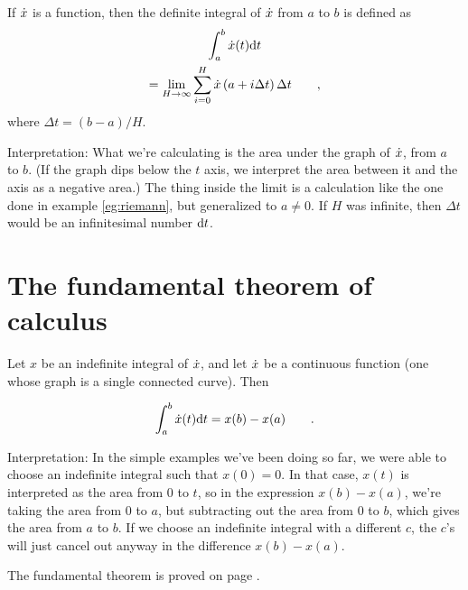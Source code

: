 \begin{important}
If $\dot{x}$ is a function, then the definite integral of $\dot{x}$ from $a$ to $b$ is
defined as
\begin{multline*}
  \int_{a}^{b} \dot{x}(t) \textup{d} t \\
= \lim_{H\rightarrow\infty} \sum_{i=0}^{H} \dot{x}\left(a+i\Delta t\right)\Delta t \qquad ,
\end{multline*}
where $\Delta t=(b-a)/H$.

Interpretation: What we're calculating is
the area under the graph of $\dot{x}$, from $a$ to $b$. (If the graph dips below the $t$ axis, we interpret the
area between it and the axis as a negative area.)
The thing inside the limit is a calculation like the one done in example \ref{eg:riemann},
but generalized to $a\ne 0$.
If $H$ was infinite, then $\Delta t$ would be an infinitesimal number $\textup{d} t$. 
\end{important}

\section{The fundamental theorem of calculus}

\begin{important}
Let $x$ be an indefinite integral of $\dot{x}$, and let $\dot{x}$ be a continuous
function (one whose graph is a single connected curve). Then

\begin{equation*}
  \int_{a}^{b} \dot{x}(t) \textup{d} t = x(b)-x(a) \qquad .
\end{equation*}

Interpretation: In the simple examples we've been doing so far,
we were able to choose an indefinite integral such that $x(0)=0$.
In that case, $x(t)$ is interpreted as the area from 0 to $t$,
so in the expression $x(b)-x(a)$, we're taking the area from
0 to $a$, but subtracting out the area from 0 to $b$, which gives
the area from $a$ to $b$. If we choose an indefinite integral with
a different $c$, the $c$'s will just cancel out anyway in the
difference  $x(b)-x(a)$.
\end{important}

The fundamental theorem is proved on page \pageref{detour:fundamental-thm-proof}.

